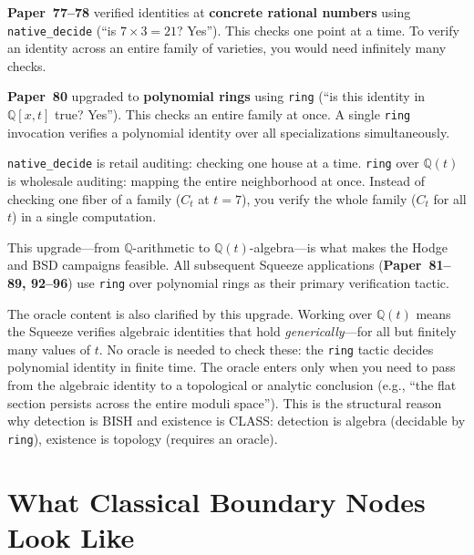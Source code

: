 \documentclass[11pt,twoside,openany]{report}
\theoremstyle{remark}
\newcommand{\BISH}{\textsf{BISH}}
\newcommand{\CLASS}{\textsf{CLASS}}
\newcommand{\paperref}[1]{\textbf{Paper~#1}}
\begin{document}
\paperref{77--78} verified identities at \textbf{concrete rational numbers} using \texttt{native\_decide} (``is $7 \times 3 = 21$? Yes''). This checks one point at a time. To verify an identity across an entire family of varieties, you would need infinitely many checks.

\paperref{80} upgraded to \textbf{polynomial rings} using \texttt{ring} (``is this identity in $\mathbb{Q}[x,t]$ true? Yes''). This checks an entire family at once. A single \texttt{ring} invocation verifies a polynomial identity over all specializations simultaneously.

\begin{analogybox}
\texttt{native\_decide} is retail auditing: checking one house at a time. \texttt{ring} over $\mathbb{Q}(t)$ is wholesale auditing: mapping the entire neighborhood at once. Instead of checking one fiber of a family ($C_t$ at $t = 7$), you verify the whole family ($C_t$ for all $t$) in a single computation.
\end{analogybox}

This upgrade---from $\mathbb{Q}$-arithmetic to $\mathbb{Q}(t)$-algebra---is what makes the Hodge and BSD campaigns feasible. All subsequent Squeeze applications (\paperref{81--89, 92--96}) use \texttt{ring} over polynomial rings as their primary verification tactic.

The oracle content is also clarified by this upgrade. Working over $\mathbb{Q}(t)$ means the Squeeze verifies algebraic identities that hold \emph{generically}---for all but finitely many values of $t$. No oracle is needed to check these: the \texttt{ring} tactic decides polynomial identity in finite time. The oracle enters only when you need to pass from the algebraic identity to a topological or analytic conclusion (e.g., ``the flat section persists across the entire moduli space''). This is the structural reason why detection is \BISH{} and existence is \CLASS: detection is algebra (decidable by \texttt{ring}), existence is topology (requires an oracle).


\section{What Classical Boundary Nodes Look Like}
\end{document}
